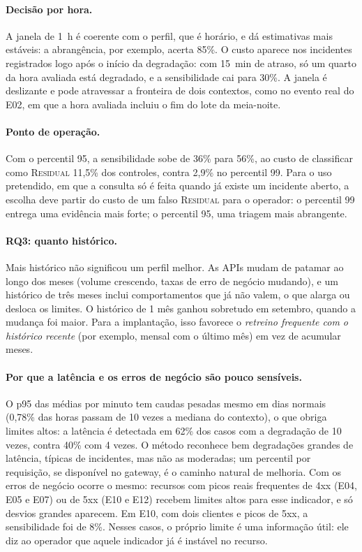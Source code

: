 \documentclass[sigconf,nonacm]{acmart}
\newcommand{\Residual}{\textsc{Residual}\xspace}
\begin{document}
\paragraph{Decisão por hora.} A janela de 1~h é coerente com o perfil, que é horário, e dá estimativas mais estáveis: a abrangência, por exemplo, acerta 85\%. O custo aparece nos incidentes registrados logo após o início da degradação: com 15~min de atraso, só um quarto da hora avaliada está degradado, e a sensibilidade cai para 30\%. A janela é deslizante e pode atravessar a fronteira de dois contextos, como no evento real do E02, em que a hora avaliada incluiu o fim do lote da meia-noite.

\paragraph{Ponto de operação.} Com o percentil 95, a sensibilidade sobe de 36\% para 56\%, ao custo de classificar como \Residual 11,5\% dos controles, contra 2,9\% no percentil 99. Para o uso pretendido, em que a consulta só é feita quando já existe um incidente aberto, a escolha deve partir do custo de um falso \Residual para o operador: o percentil 99 entrega uma evidência mais forte; o percentil 95, uma triagem mais abrangente.

\paragraph{RQ3: quanto histórico.} Mais histórico não significou um perfil melhor. As APIs mudam de patamar ao longo dos meses (volume crescendo, taxas de erro de negócio mudando), e um histórico de três meses inclui comportamentos que já não valem, o que alarga ou desloca os limites. O histórico de 1 mês ganhou sobretudo em setembro, quando a mudança foi maior. Para a implantação, isso favorece o \emph{retreino frequente com o histórico recente} (por exemplo, mensal com o último mês) em vez de acumular meses.

\paragraph{Por que a latência e os erros de negócio são pouco sensíveis.} O p95 das médias por minuto tem caudas pesadas mesmo em dias normais (0,78\% das horas passam de 10 vezes a mediana do contexto), o que obriga limites altos: a latência é detectada em 62\% dos casos com a degradação de 10 vezes, contra 40\% com 4 vezes. O método reconhece bem degradações grandes de latência, típicas de incidentes, mas não as moderadas; um percentil por requisição, se disponível no gateway, é o caminho natural de melhoria. Com os erros de negócio ocorre o mesmo: recursos com picos reais frequentes de 4xx (E04, E05 e E07) ou de 5xx (E10 e E12) recebem limites altos para esse indicador, e só desvios grandes aparecem. Em E10, com dois clientes e picos de 5xx, a sensibilidade foi de 8\%. Nesses casos, o próprio limite é uma informação útil: ele diz ao operador que aquele indicador já é instável no recurso.
\end{document}
